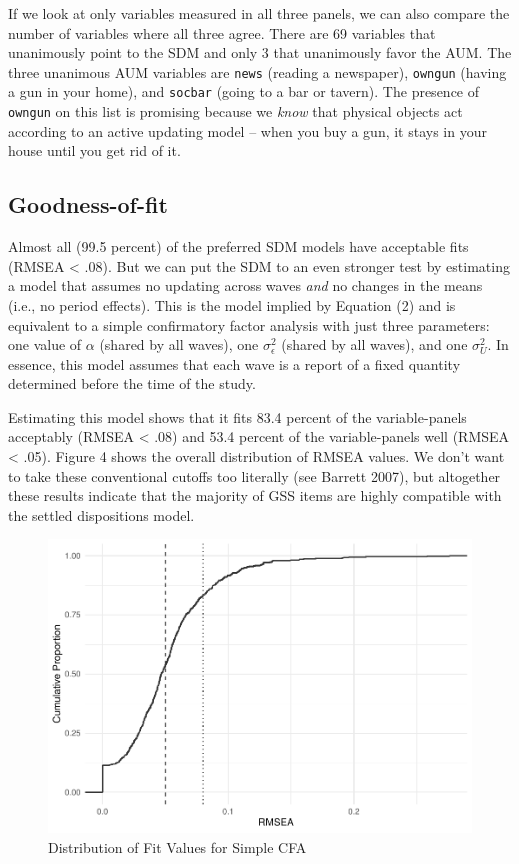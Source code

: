 \documentclass[
  11pt,
]{article}
\begin{document}
If we look at only variables measured in all three panels, we can also compare the number of variables where all three agree. There are 69 variables that unanimously point to the SDM and only 3 that unanimously favor the AUM. The three unanimous AUM variables are \texttt{news} (reading a newspaper), \texttt{owngun} (having a gun in your home), and \texttt{socbar} (going to a bar or tavern). The presence of \texttt{owngun} on this list is promising because we \emph{know} that physical objects act according to an active updating model -- when you buy a gun, it stays in your house until you get rid of it.

\hypertarget{goodness-of-fit}{%
\subsection{Goodness-of-fit}\label{goodness-of-fit}}

Almost all (99.5 percent) of the preferred SDM models have acceptable fits (RMSEA \textless{} .08). But we can put the SDM to an even stronger test by estimating a model that assumes no updating across waves \emph{and} no changes in the means (i.e., no period effects). This is the model implied by Equation (2) and is equivalent to a simple confirmatory factor analysis with just three parameters: one value of \(\alpha\) (shared by all waves), one \(\sigma^2_{\epsilon}\) (shared by all waves), and one \(\sigma^2_U\). In essence, this model assumes that each wave is a report of a fixed quantity determined before the time of the study.

Estimating this model shows that it fits 83.4 percent of the variable-panels acceptably (RMSEA \textless{} .08) and 53.4 percent of the variable-panels well (RMSEA \textless{} .05). Figure 4 shows the overall distribution of RMSEA values. We don't want to take these conventional cutoffs too literally (see Barrett 2007), but altogether these results indicate that the majority of GSS items are highly compatible with the settled dispositions model.

\begin{figure}
\centering
\includegraphics{ms_files/figure-latex/cfa-1.pdf}
\caption{\label{fig:cfa}Distribution of Fit Values for Simple CFA}
\end{figure}
\end{document}
